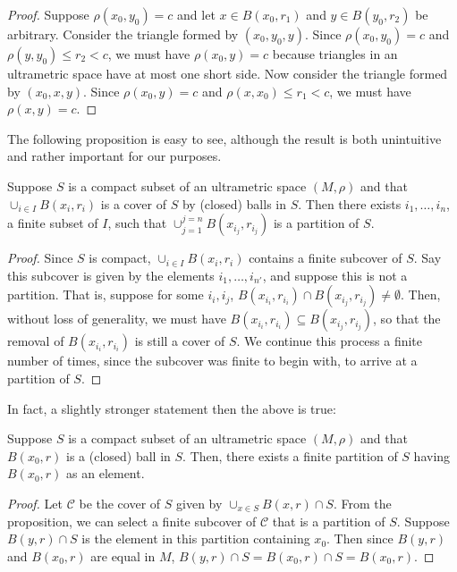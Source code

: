 \begin{proof}
Suppose $\rho(x_0, y_0)=c$ and let $x \in B(x_0, r_1)$ and $y \in B(y_0, r_2)$ be arbitrary. Consider the triangle formed by $(x_0, y_0,y)$. Since $\rho(x_0,y_0)=c$ and  $\rho(y,y_0) \leq r_2 < c$, we must have $\rho(x_0, y)=c$ because triangles in an ultrametric space have at most one short side. Now consider the triangle formed by  $(x_0, x,y)$. Since $\rho(x_0, y)=c$ and  $\rho(x,x_0) \leq r_1 < c$, we must have $\rho(x, y)=c$.
\end{proof}

The following proposition is  easy to see, although the result is both unintuitive and  rather important for our purposes. \\

\begin{proposition}
Suppose $S$ is a compact subset of an ultrametric space $(M, \rho)$ and that $\cup_{i \in I} B(x_i,r_i)$ is a cover of $S$ by (closed) balls in $S$. Then there exists $i_1,\ldots, i_n$, a finite subset of $I$, such that  $\cup_{j=1}^{j=n} B(x_{i_j},r_{i_j})$ is a partition of $S$.
\end{proposition}

\begin{proof}
Since $S$ is compact, $\cup_{i \in I} B(x_i,r_i)$ contains a finite subcover of $S$. Say this subcover is given by the elements  $i_1,\ldots, i_{n'}$, and suppose this is not a partition. That is, suppose for some $i_i, i_j$, $ B(x_{i_i},r_{i_i}) \cap  B(x_{i_j},r_{i_j}) \neq \emptyset$. Then, without loss of generality, we must have $ B(x_{i_i},r_{i_i}) \subseteq  B(x_{i_j},r_{i_j})$, so that the removal of $ B(x_{i_i},r_{i_i})$ is still a cover of $S$. We continue this process a finite number of times, since the subcover was finite to begin with, to arrive at a partition of $S$.
\end{proof}

In fact, a slightly stronger statement then the above is true:

\begin{corollary}
Suppose $S$ is a compact subset of an ultrametric space $(M, \rho)$ and that $B(x_0,r)$ is a (closed) ball in $S$. Then, there exists a finite partition of $S$ having $B(x_0,r)$ as an element.
\end{corollary}

\begin{proof}
Let $\mathcal{C}$ be the cover of $S$ given by $\cup_{x\in S} B(x,r) \cap S$. From the proposition, we can select a finite subcover of $\mathcal{C}$ that is a partition of $S$. Suppose $B(y,r) \cap S$ is the element in this partition containing $x_0$. Then  since $B(y,r)$ and $B(x_0,r)$ are equal in $M$, $B(y,r) \cap S = B(x_0,r) \cap S = B(x_0,r)$.
\end{proof}

